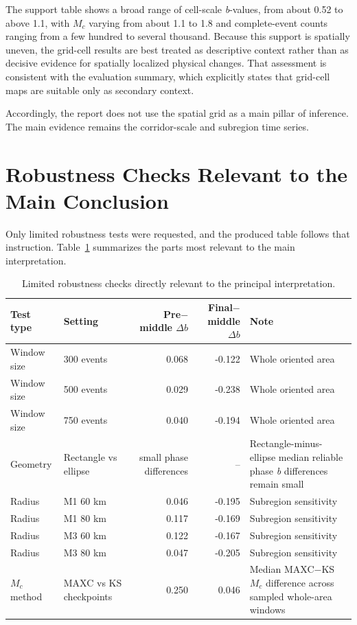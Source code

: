 \documentclass[11pt]{article}
\begin{document}
The support table shows a broad range of cell-scale \textit{b}-values, from about 0.52 to above 1.1, with $M_c$ varying from about 1.1 to 1.8 and complete-event counts ranging from a few hundred to several thousand. Because this support is spatially uneven, the grid-cell results are best treated as descriptive context rather than as decisive evidence for spatially localized physical changes. That assessment is consistent with the evaluation summary, which explicitly states that grid-cell maps are suitable only as secondary context.

Accordingly, the report does not use the spatial grid as a main pillar of inference. The main evidence remains the corridor-scale and subregion time series.

\section{Robustness Checks Relevant to the Main Conclusion}
Only limited robustness tests were requested, and the produced table follows that instruction. Table~\ref{tab:robustness} summarizes the parts most relevant to the main interpretation.

\begin{table}[H]
\centering
\caption{Limited robustness checks directly relevant to the principal interpretation.}
\label{tab:robustness}
\begin{tabularx}{\textwidth}{l l r r >{\raggedright\arraybackslash}X}
\toprule
Test type & Setting & Pre$-$middle $\Delta b$ & Final$-$middle $\Delta b$ & Note\\
\midrule
Window size & 300 events & 0.068 & -0.122 & Whole oriented area\\
Window size & 500 events & 0.029 & -0.238 & Whole oriented area\\
Window size & 750 events & 0.040 & -0.194 & Whole oriented area\\
Geometry & Rectangle vs ellipse & small phase differences & -- & Rectangle-minus-ellipse median reliable phase \textit{b} differences remain small\\
Radius & M1 60 km & 0.046 & -0.195 & Subregion sensitivity\\
Radius & M1 80 km & 0.117 & -0.169 & Subregion sensitivity\\
Radius & M3 60 km & 0.122 & -0.167 & Subregion sensitivity\\
Radius & M3 80 km & 0.047 & -0.205 & Subregion sensitivity\\
$M_c$ method & MAXC vs KS checkpoints & 0.250 & 0.046 & Median MAXC$-$KS $M_c$ difference across sampled whole-area windows\\
\bottomrule
\end{tabularx}
\end{table}
\end{document}
